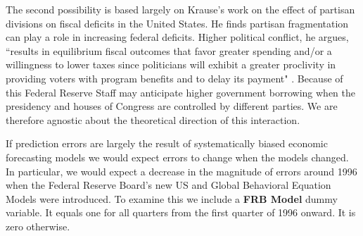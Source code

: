 \documentclass[a4paper]{article}
\begin{document}
The second possibility is based largely on Krause's \citeyearpar{Krause2000} work on the effect of partisan divisions on fiscal deficits in the United States. He finds partisan fragmentation can play a role in increasing federal deficits. Higher political conflict, he argues, ``results in equilibrium fiscal outcomes that favor greater spending and/or a willingness to lower taxes since politicians will exhibit a greater proclivity in providing voters with program benefits and to delay its payment" \citep[][542]{Krause2000}. Because of this Federal Reserve Staff may anticipate higher government borrowing when the presidency and houses of Congress are controlled by different parties. We are therefore agnostic about the theoretical direction of this interaction.

If prediction errors are largely the result of systematically biased economic forecasting models we would expect errors to change when the models changed. In particular, we would expect a decrease in the magnitude of errors around 1996 when the Federal Reserve Board's new US and Global Behavioral Equation Models were introduced. To examine this we include a {\bf{FRB Model}} dummy variable. It equals one for all quarters from the first quarter of 1996 onward. It is zero otherwise.
\end{document}

